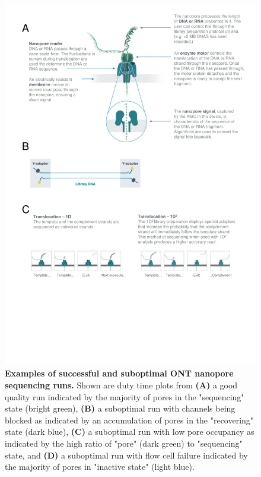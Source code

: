 \begin{figure}[]
	\centering
	\includegraphics[page=6,trim={0 14cm 0 0 },clip, scale = 0.8]{Figures/ProjectDevelopment_FiguresONT}
	\captionsetup{width=0.95\textwidth}
	\caption[Examples of successful and suboptimal ONT nanopore sequencing runs]%
	{\textbf{Examples of successful and suboptimal ONT nanopore sequencing runs.} Shown are duty time plots from \textbf{(A)} a good quality run indicated by the majority of pores in the "sequencing" state (bright green), \textbf{(B)} a suboptimal run with channels being blocked as indicated by an accumulation of pores in the "recovering" state (dark blue), \textbf{(C)} a suboptimal run with low pore occupancy as indicated by the high ratio of "pore" (dark green) to "sequencing" state, and \textbf{(D)} a suboptimal run with flow cell failure indicated by the majority of pores in "inactive state" (light blue). 
}
\end{figure}

